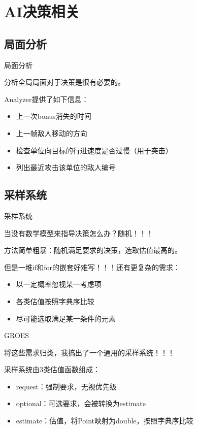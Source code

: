 \documentclass[aspectratio=43,compress]{beamer}
\begin{document}
\section{AI决策相关}
\subsection{局面分析}
\begin{frame}{局面分析}
\begin{card}
分析全局局面对于决策是很有必要的。

Analyzer提供了如下信息：
\begin{itemize}
\item 上一次bonus消失的时间
\item 上一帧敌人移动的方向
\item 检查单位向目标的行进速度是否过慢（用于突击）
\item 列出最近攻击该单位的敌人编号
\end{itemize}
\end{card}
\end{frame}

\subsection{采样系统}
\begin{frame}{采样系统}
\begin{card}[起源]
    当没有数学模型来指导决策怎么办？随机！！！

    方法简单粗暴：随机满足要求的决策，选取估值最高的。
\end{card}
\begin{card}[进阶]
    但是一堆if和for的嵌套好难写！！！还有更复杂的需求：
    \begin{itemize}
        \item 以一定概率忽视某一考虑项
        \item 各类估值按照字典序比较
        \item 尽可能选取满足某一条件的元素
    \end{itemize}
\end{card}
\end{frame}

\begin{frame}{GROES}
\begin{card}
将这些需求归类，我搞出了一个通用的采样系统！！！

采样系统由3类估值函数组成：
\begin{itemize}
    \item request：强制要求，无视优先级
    \item optional：可选要求，会被转换为estimate
    \item estimate：估值，将Point映射为double，按照字典序比较
\end{itemize}
\end{card}
\end{frame}
\end{document}
